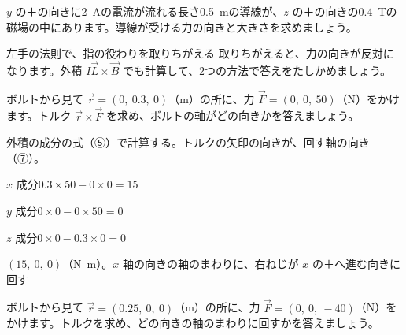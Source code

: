 \begin{jibun}
$y$ の＋の向きに\qty{2}{A}の電流が流れる長さ\qty{0.5}{m}の導線が、$z$ の＋の向きの\qty{0.4}{T}の磁場の中にあります。導線が受ける力の向きと大きさを求めましょう。
\end{jibun}

\begin{tsumazuki}{左手の法則で、指の役わりを取りちがえる}
取りちがえると、力の向きが反対になります。外積 $I\vec L\times\vec B$ でも計算して、2つの方法で答えをたしかめましょう。
\end{tsumazuki}

\begin{reidai}[トルクのベクトル]
ボルトから見て $\vec r=(0,\ 0.3,\ 0)$（m）の所に、力 $\vec F=(0,\ 0,\ 50)$（N）をかけます。トルク $\vec r\times\vec F$ を求め、ボルトの軸がどの向きかを答えましょう。\par
\kangaekata 外積の成分の式（⑤）で計算する。トルクの矢印の向きが、回す軸の向き（⑦）。\par
\shiki $x$ 成分\enspace $0.3\times50-0\times0=15$\par
\hspace*{2.6\zw}$y$ 成分\enspace $0\times0-0\times50=0$\par
\hspace*{2.6\zw}$z$ 成分\enspace $0\times0-0.3\times0=0$\par
\kotae $(15,\ 0,\ 0)$（\unit[inter-unit-product=\ensuremath{\cdot}]{N.m}）。$x$ 軸の向きの軸のまわりに、右ねじが $x$ の＋へ進む向きに回す
\end{reidai}

\begin{jibun}
ボルトから見て $\vec r=(0.25,\ 0,\ 0)$（m）の所に、力 $\vec F=(0,\ 0,\ -40)$（N）をかけます。トルクを求め、どの向きの軸のまわりに回すかを答えましょう。
\end{jibun}

